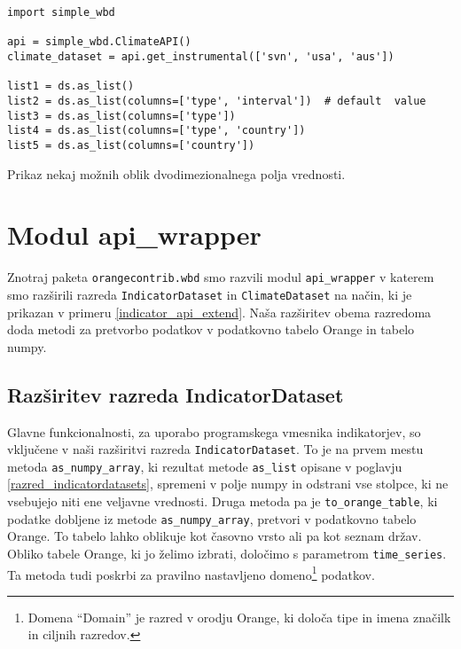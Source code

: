 \begin{snippet}
\begin{center}
\begin{lstlisting}
import simple_wbd

api = simple_wbd.ClimateAPI()                   
climate_dataset = api.get_instrumental(['svn', 'usa', 'aus'])

list1 = ds.as_list()
list2 = ds.as_list(columns=['type', 'interval'])  # default  value
list3 = ds.as_list(columns=['type'])
list4 = ds.as_list(columns=['type', 'country']) 
list5 = ds.as_list(columns=['country'])
\end{lstlisting}
\end{center}
\cprotect
\caption{Prikaz nekaj možnih oblik dvodimezionalnega polja vrednosti.} 
\label{list_configurations}
\end{snippet} 



\section{Modul api\_wrapper}


Znotraj paketa \verb|orangecontrib.wbd| smo razvili modul \verb|api_wrapper| v
katerem smo razširili razreda \verb|IndicatorDataset| in \verb|ClimateDataset|
na način, ki je prikazan v primeru \ref{indicator_api_extend}. Naša
razširitev obema razredoma doda metodi za pretvorbo podatkov v podatkovno 
tabelo Orange in tabelo numpy.

\subsection{Razširitev razreda IndicatorDataset}

Glavne funkcionalnosti, za uporabo programskega vmesnika indikatorjev, so
vključene v naši razširitvi razreda \verb|IndicatorDataset|. To je na prvem
mestu metoda \verb|as_numpy_array|, ki rezultat metode \verb|as_list|
opisane v poglavju \ref{razred_indicatordatasets}, spremeni v polje numpy in odstrani vse
stolpce, ki ne vsebujejo niti ene veljavne vrednosti. Druga metoda pa je
\verb|to_orange_table|, ki podatke dobljene iz metode \verb|as_numpy_array|,
pretvori v podatkovno tabelo Orange. To tabelo lahko oblikuje kot časovno
vrsto ali pa kot seznam držav. %
Obliko tabele Orange, ki jo želimo izbrati,
določimo s parametrom \verb|time_series|. %
Ta metoda tudi poskrbi za pravilno nastavljeno domeno\footnote{Domena
``Domain'' je razred v orodju Orange, ki določa tipe in imena značilk in
ciljnih razredov.} podatkov.


